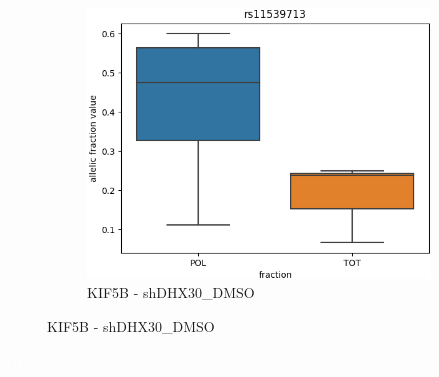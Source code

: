 \documentclass[aspectration=1610]{beamer}
\begin{document}
\begin{frame}
\begin{figure}
\begin{subfigure}{0.33\textwidth}
			 	\caption{KIF5B - shDHX30\_DMSO}
			 	\includegraphics[width=\textwidth]{media/shDHX30_DMSO_rs11539713.png}
			 \end{subfigure}
			\end{figure}
		 \end{frame}
		 \begin{frame}
			 \Huge{\textcolor{white}{Grazie per l'attenzione.}}
		 \end{frame}
\end{document}
